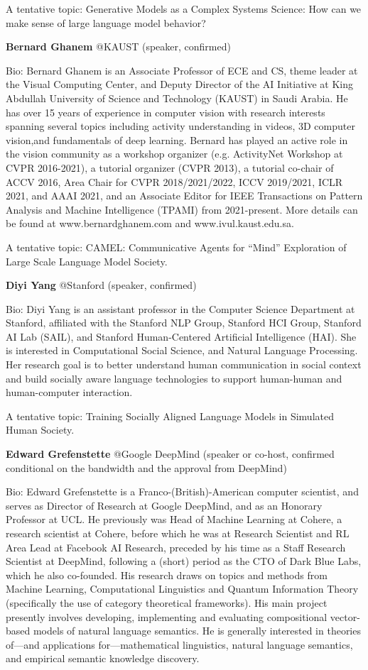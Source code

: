 \documentclass[10pt]{article} %
\begin{document}
A tentative topic: Generative Models as a Complex Systems Science: How can we make sense of large language model behavior?


{\bf Bernard Ghanem} @KAUST (speaker, confirmed)  
  
Bio: Bernard Ghanem is an Associate Professor of ECE and CS, theme leader at the Visual Computing Center, and Deputy Director of the AI Initiative at King Abdullah University of Science and Technology (KAUST) in Saudi Arabia. He has over 15 years of experience in computer vision with research interests spanning several topics including activity understanding in videos, 3D computer vision,and fundamentals of deep learning. Bernard has played an active role in the vision community as a workshop organizer (e.g. ActivityNet Workshop at CVPR 2016-2021), a tutorial organizer (CVPR 2013), a tutorial co-chair of ACCV 2016, Area Chair for CVPR 2018/2021/2022, ICCV 2019/2021, ICLR 2021, and AAAI 2021, and an Associate Editor for IEEE Transactions on Pattern Analysis and Machine Intelligence (TPAMI) from 2021-present. More details can be found at www.bernardghanem.com and www.ivul.kaust.edu.sa.  

A tentative topic: CAMEL: Communicative Agents for ``Mind'' Exploration of Large Scale Language Model Society.


{\bf Diyi Yang} @Stanford (speaker, confirmed)  
  
Bio: Diyi Yang is an assistant professor in the Computer Science Department at Stanford, affiliated with the Stanford NLP Group, Stanford HCI Group, Stanford AI Lab (SAIL), and Stanford Human-Centered Artificial Intelligence (HAI). She is interested in Computational Social Science, and Natural Language Processing. Her research goal is to better understand human communication in social context and build socially aware language technologies to support human-human and human-computer interaction.  

A tentative topic: Training Socially Aligned Language Models in Simulated Human Society.


{\bf Edward Grefenstette} @Google DeepMind (speaker or co-host, confirmed conditional on the bandwidth and the approval from DeepMind)  
  
Bio: Edward Grefenstette is a Franco-(British)-American computer scientist, and serves as Director of Research at Google DeepMind, and as an Honorary Professor at UCL. He previously was Head of Machine Learning at Cohere, a research scientist at Cohere, before which he was at Research Scientist and RL Area Lead at Facebook AI Research, preceded by his time as a Staff Research Scientist at DeepMind, following a (short) period as the CTO of Dark Blue Labs, which he also co-founded. His research draws on topics and methods from Machine Learning, Computational Linguistics and Quantum Information Theory (specifically the use of category theoretical frameworks). His main project presently involves developing, implementing and evaluating compositional vector-based models of natural language semantics. He is generally interested in theories of—and applications for—mathematical linguistics, natural language semantics, and empirical semantic knowledge discovery.  
\end{document}

